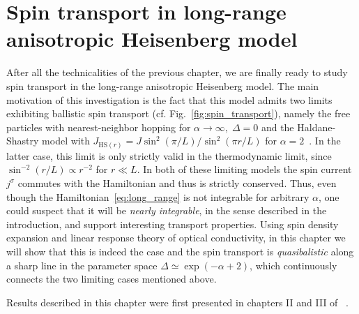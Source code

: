 \chapter{Spin transport in long-range anisotropic Heisenberg model\label{chap:spin_transport}}
\thispagestyle{chapterBeginStyle}

After all the technicalities of the previous chapter, we are finally ready to study spin transport in
the long-range anisotropic Heisenberg model. The main motivation of this investigation is the fact that this model admits 
two limits exhibiting ballistic spin transport (cf. Fig.~\ref{fig:spin_transport}), namely the free particles
with nearest-neighbor hopping for \(\alpha\to \infty,\; \Delta = 0\) and the Haldane-Shastry
model with \(J_{\mathrm{HS}(r)} = J \sin^2\left(\pi/L\right)/\sin^2\left(\pi r/L\right)\)
 for \(\alpha = 2\)~\autocite{Haldane1988,Shastry1988}. In the latter case, this limit is only strictly valid
 in the thermodynamic limit, since \(\sin^{-2}\left(r/L\right)\propto r^{-2}\) for \(r \ll L\).
 In both of these limiting models the spin current 
\(j^{\sigma}\) commutes with the Hamiltonian and thus is strictly conserved. Thus, even though
the Hamiltonian~\eqref{eq:long_range} is not integrable for arbitrary \(\alpha\), one could suspect
that it will be \textit{nearly integrable}, in the sense described in the introduction, and support
interesting transport properties. Using spin density expansion and linear response theory
of optical conductivity, in this chapter we will show that this is indeed the case and the spin transport is \textit{quasibalistic} along a sharp
line in the parameter space \(\Delta \simeq \exp(- \alpha + 2)\), which continuously connects the two limiting
cases mentioned above.

Results described in this chapter were first presented in chapters II and III of ~\textcite{Mierzejewski2023}.

